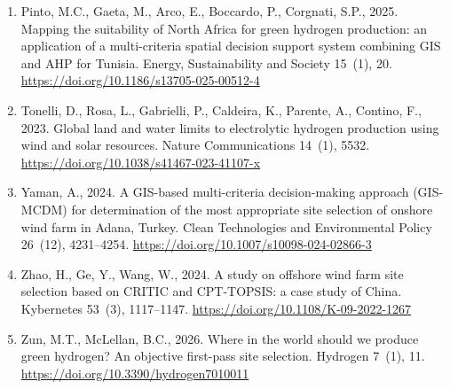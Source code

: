 \begin{enumerate}
\item Pinto, M.C., Gaeta, M., Arco, E., Boccardo, P., Corgnati, S.P., 2025. Mapping the suitability of North Africa for green hydrogen production: an application of a multi-criteria spatial decision support system combining GIS and AHP for Tunisia. Energy, Sustainability and Society 15~(1), 20. \url{https://doi.org/10.1186/s13705-025-00512-4}
\item Tonelli, D., Rosa, L., Gabrielli, P., Caldeira, K., Parente, A., Contino, F., 2023. Global land and water limits to electrolytic hydrogen production using wind and solar resources. Nature Communications 14~(1), 5532. \url{https://doi.org/10.1038/s41467-023-41107-x}
\item Yaman, A., 2024. A GIS-based multi-criteria decision-making approach (GIS-MCDM) for determination of the most appropriate site selection of onshore wind farm in Adana, Turkey. Clean Technologies and Environmental Policy 26~(12), 4231--4254. \url{https://doi.org/10.1007/s10098-024-02866-3}
\item Zhao, H., Ge, Y., Wang, W., 2024. A study on offshore wind farm site selection based on CRITIC and CPT-TOPSIS: a case study of China. Kybernetes 53~(3), 1117--1147. \url{https://doi.org/10.1108/K-09-2022-1267}
\item Zun, M.T., McLellan, B.C., 2026. Where in the world should we produce green hydrogen? An objective first-pass site selection. Hydrogen 7~(1), 11. \url{https://doi.org/10.3390/hydrogen7010011}
\end{enumerate}
